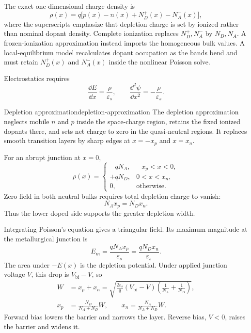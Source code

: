 The exact one-dimensional charge density is
\begin{equation}
  \rho(x)=q\bigl[p(x)-n(x)+N_D^+(x)-N_A^-(x)\bigr],
  \label{eq:pn-exact-charge-density}
\end{equation}
where the superscripts emphasize that depletion charge is set by ionized
rather than nominal dopant density.  Complete ionization replaces
$N_D^+,N_A^-$ by $N_D,N_A$.  A frozen-ionization approximation instead imports
the homogeneous bulk values.  A local-equilibrium model recalculates dopant
occupation as the bands bend and must retain $N_D^+(x)$ and $N_A^-(x)$ inside
the nonlinear Poisson solve.

Electrostatics requires
\begin{equation}
  \frac{\dd E}{\dd x}=\frac{\rho}{\varepsilon_s},
  \qquad
  \frac{\dd^2\psi}{\dd x^2}=-\frac{\rho}{\varepsilon_s}.
  \label{eq:pn-poisson}
\end{equation}

\begin{definition}{Depletion approximation}{depletion-approximation}
The depletion approximation neglects mobile $n$ and $p$ inside the space-charge
region, retains the fixed ionized dopants there, and sets net charge to zero in
the quasi-neutral regions.  It replaces smooth transition layers by sharp
edges at $x=-x_p$ and $x=x_n$.
\end{definition}

For an abrupt junction at $x=0$,
\begin{equation}
 \rho(x)=
 \begin{cases}
  -qN_A,&-x_p<x<0,\\
  +qN_D,&0<x<x_n,\\
  0,&\text{otherwise}.
 \end{cases}
 \label{eq:pn-abrupt-charge}
\end{equation}
Zero field in both neutral bulks requires total depletion charge to vanish:
\begin{equation}
  \boxed{N_Ax_p=N_Dx_n.}
  \label{eq:pn-charge-neutrality}
\end{equation}
Thus the lower-doped side supports the greater depletion width.

Integrating Poisson's equation gives a triangular field.  Its maximum magnitude
at the metallurgical junction is
\begin{equation}
  E_m=\frac{qN_Ax_p}{\varepsilon_s}
     =\frac{qN_Dx_n}{\varepsilon_s}.
  \label{eq:pn-maximum-field}
\end{equation}
The area under $-E(x)$ is the depletion potential.  Under applied junction
voltage $V$, this drop is $V_{\mathrm{bi}}-V$, so
\begin{align}
  W&=x_p+x_n
  =\sqrt{\frac{2\varepsilon_s}{q}(V_{\mathrm{bi}}-V)
  \left(\frac{1}{N_A}+\frac{1}{N_D}\right)},
  \label{eq:pn-abrupt-width}\\
  x_p&=\frac{N_D}{N_A+N_D}W,
  \qquad
  x_n=\frac{N_A}{N_A+N_D}W.
  \label{eq:pn-width-partition}
\end{align}
Forward bias lowers the barrier and narrows the layer.  Reverse bias, $V<0$,
raises the barrier and widens it.

